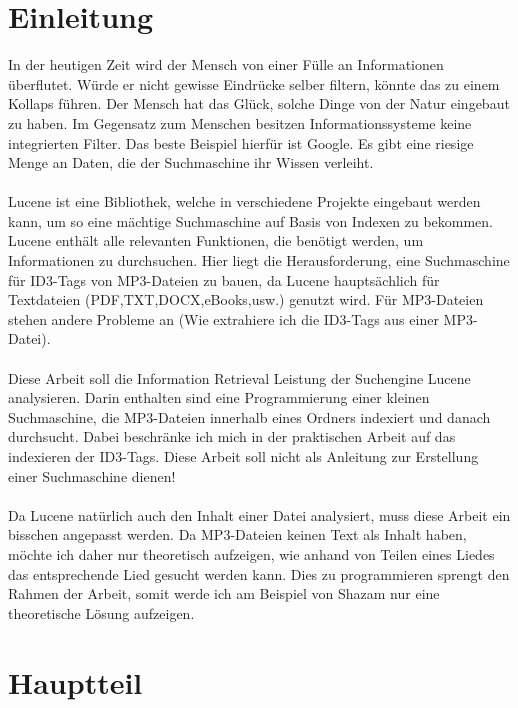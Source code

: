 \documentclass[12pt,a4paper,ngerman]{report}
\begin{document}
\chapter{Einleitung}
In der heutigen Zeit wird der Mensch von einer Fülle an Informationen überflutet. Würde er nicht gewisse Eindrücke selber filtern, könnte das zu einem Kollaps führen. Der Mensch hat das Glück, solche Dinge von der Natur eingebaut zu haben. Im Gegensatz zum Menschen besitzen Informationssysteme keine integrierten Filter. Das beste Beispiel hierfür ist Google. Es gibt eine riesige Menge an Daten, die der Suchmaschine ihr Wissen verleiht.
\\
\\
Lucene ist eine Bibliothek, welche in verschiedene Projekte eingebaut werden kann, um so eine mächtige Suchmaschine auf Basis von Indexen zu bekommen. Lucene enthält alle relevanten Funktionen, die benötigt werden, um Informationen zu durchsuchen. Hier liegt die Herausforderung, eine Suchmaschine für ID3-Tags von MP3-Dateien zu bauen, da Lucene hauptsächlich für Textdateien (PDF,TXT,DOCX,eBooks,usw.) genutzt wird. Für MP3-Dateien stehen andere Probleme an (Wie extrahiere ich die ID3-Tags aus einer MP3-Datei). 
\\
\\
Diese Arbeit soll die Information Retrieval Leistung der Suchengine Lucene analysieren. Darin enthalten sind eine Programmierung einer kleinen Suchmaschine, die MP3-Dateien innerhalb eines Ordners indexiert und danach durchsucht. Dabei beschränke ich mich in der praktischen Arbeit auf das indexieren der ID3-Tags. Diese Arbeit soll nicht als Anleitung zur Erstellung einer Suchmaschine dienen!
\\
\\
Da Lucene natürlich auch den Inhalt einer Datei analysiert, muss diese Arbeit ein bisschen angepasst werden. Da MP3-Dateien keinen Text als Inhalt haben, möchte ich daher nur theoretisch aufzeigen, wie anhand von Teilen eines Liedes das entsprechende Lied gesucht werden kann. Dies zu programmieren sprengt den Rahmen der Arbeit, somit werde ich am Beispiel von Shazam nur eine theoretische Lösung aufzeigen.
\chapter{Hauptteil}
\end{document}
